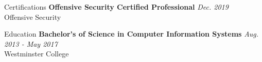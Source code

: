 \documentclass{resume} %
\begin{document}
\begin{rSection}{\vspace{-5pt}Certifications}
  {\bf Offensive Security Certified Professional} \hfill {\em Dec. 2019} 
  \\ Offensive Security
\end{rSection}




\begin{rSection}{\vspace{-5pt}Education}
  {\bf Bachelor's of Science in Computer Information Systems} \hfill {\em Aug. 2013 - May 2017} 
  \\ Westminster College
\end{rSection}
\end{document}
